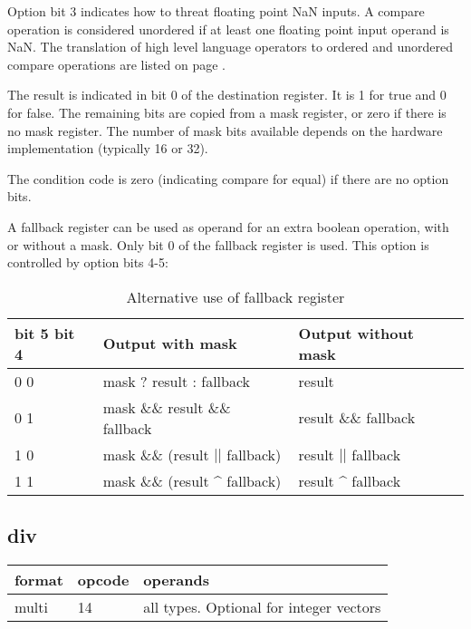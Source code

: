 \documentclass[forwardcom.tex]{subfiles}
\begin{document}
Option bit 3 indicates how to threat floating point NaN inputs. A compare operation is considered unordered if at least one floating point input operand is NaN. The translation of high level language operators to ordered and unordered compare operations are listed on page \pageref{table:floatCompareJumpInstructions}.
\vv

The result is indicated in bit 0 of the destination register. It is 1 for true and 0 for false. The remaining bits are copied from a mask register, or zero if there is no mask register. The number of mask bits available depends on the hardware implementation (typically 16 or 32).
\vv

The condition code is zero (indicating compare for equal) if there are no option bits. 
\vv
 
A fallback register can be used as operand for an extra boolean operation, with or without a mask. Only bit 0 of the fallback register is used. 
This option is controlled by option bits 4-5:

\begin{longtable} {|p{25mm}|p{50mm}|p{50mm}|}
\caption{Alternative use of fallback register} 
\label{table:AlternativeFallbackForCompare} \\
\endfirsthead
\endhead
\hline
\bfseries bit 5 bit 4 & \bfseries Output with mask & \bfseries Output without mask \\
\hline
\hspace{5mm} 0 0 & mask ? result : fallback  & result \\
\hline
\hspace{5mm} 0 1 & mask \&\& result \&\& fallback & result \&\& fallback \\
\hline
\hspace{5mm} 1 0 & mask \&\& (result $||$ fallback) & result $||$ fallback \\
\hline
\hspace{5mm} 1 1 & mask \&\& (result \^{} fallback) & result \^{} fallback \\
\hline
\end{longtable}
\vv

\subsection{div}
\label{table:divInstruction}
\begin{tabular}{|p{12mm}|p{15mm}|p{100mm}|}
\hline
\bfseries format & \bfseries opcode & \bfseries operands \\ \hline
multi & 14 & all types. Optional for integer vectors \\ \hline
\end{tabular}
\vv
\end{document}
